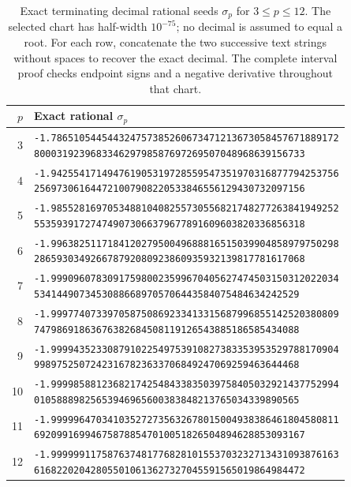 \begin{table}[htbp]
\centering
\caption{Exact terminating decimal rational seeds $\sigma_p$ for $3\le p\le12$.
The selected chart has half-width $10^{-75}$; no decimal is
assumed to equal a root.  For each row, concatenate the two successive text strings without spaces to recover the exact decimal. The complete interval proof checks
endpoint signs and a negative derivative throughout that chart.}
\label{tab:seeds}
\begingroup\fontsize{7.0}{8.4}\selectfont
\begin{tabular}{@{}r l@{}}
\toprule
$p$ & Exact rational $\sigma_p$\\ \midrule
3&\shortstack[l]{\texttt{-1.786510544544324757385260673471213673058457671889172}\\\texttt{800031923968334629798587697269507048968639156733}}\\
4&\shortstack[l]{\texttt{-1.942554171494761905319728559547351970316877794253756}\\\texttt{256973061644721007908220533846556129430732097156}}\\
5&\shortstack[l]{\texttt{-1.985528169705348810408255730556821748277263841949252}\\\texttt{553593917274749073066379677891609603820336856318}}\\
6&\shortstack[l]{\texttt{-1.996382511718412027950049688816515039904858979750298}\\\texttt{286593034926678792080923860935932139817781617068}}\\
7&\shortstack[l]{\texttt{-1.999096078309175980023599670405627474503150312022034}\\\texttt{53414490734530886689705706443584075484634242529}}\\
8&\shortstack[l]{\texttt{-1.999774073397058750869233413315687996855142520380809}\\\texttt{74798691863676382684508119126543885186585434088}}\\
9&\shortstack[l]{\texttt{-1.999943523308791022549753910827383353953529788170904}\\\texttt{99897525072423167823633706849247069259463644468}}\\
10&\shortstack[l]{\texttt{-1.999985881236821742548433835039758405032921437752994}\\\texttt{01058889825653946965600383848213765034339890565}}\\
11&\shortstack[l]{\texttt{-1.999996470341035272735632678015004938386461804580811}\\\texttt{692099169946758788547010051826504894628853093167}}\\
12&\shortstack[l]{\texttt{-1.999999117587637481776828101553703232713431093876163}\\\texttt{616822020428055010613627327045591565019864984472}}\\
\bottomrule
\end{tabular}
\endgroup
\end{table}
